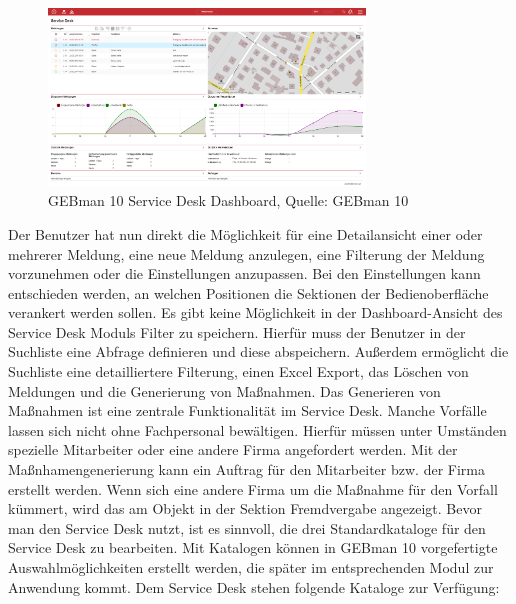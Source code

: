 \begin{figure}[h!]
\centering
	\includegraphics[width=0.75\textwidth]{Abbildungen/GEBman.png}
	\caption[GEBman 10 Service Desk Dashboard]{GEBman 10 Service Desk Dashboard, Quelle: 
	GEBman 10}
	\label{fig:GEBman10 Service Desk Dashboard}
\end{figure}

\noindent
Der Benutzer hat nun direkt die Möglichkeit für eine Detailansicht einer oder mehrerer Meldung, eine neue Meldung anzulegen, eine Filterung der Meldung vorzunehmen oder die Einstellungen anzupassen. Bei den Einstellungen kann entschieden werden, an welchen Positionen die Sektionen der Bedienoberfläche verankert werden sollen.\newline
Es gibt keine Möglichkeit in der Dashboard-Ansicht des Service Desk Moduls Filter zu speichern. Hierfür muss der Benutzer in der Suchliste eine Abfrage definieren und diese abspeichern. Außerdem ermöglicht die Suchliste eine detailliertere Filterung, einen Excel Export, das Löschen von Meldungen und die Generierung von Maßnahmen. Das Generieren von Maßnahmen ist eine zentrale Funktionalität im Service Desk. Manche Vorfälle lassen sich nicht ohne Fachpersonal bewältigen. Hierfür müssen unter Umständen spezielle Mitarbeiter oder eine andere Firma angefordert werden. Mit der Maßnhamengenerierung kann ein Auftrag für den Mitarbeiter bzw. der Firma erstellt werden. Wenn sich eine andere Firma um die Maßnahme für den Vorfall kümmert, wird das am Objekt in der Sektion Fremdvergabe angezeigt. \newline
Bevor man den Service Desk nutzt, ist es sinnvoll, die drei Standardkataloge für den Service Desk zu bearbeiten. Mit Katalogen können in GEBman 10  vorgefertigte Auswahlmöglichkeiten erstellt werden, die später im entsprechenden Modul zur Anwendung kommt. Dem Service Desk stehen folgende Kataloge zur Verfügung:

